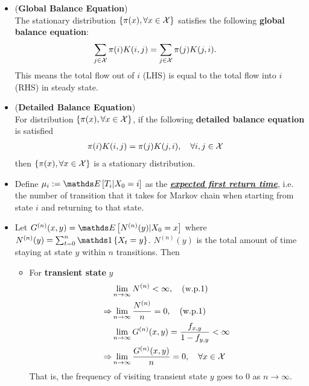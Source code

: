 \documentclass[11pt]{article}
\begin{document}
\begin{itemize}
\item \begin{proposition} (\textbf{Global Balance Equation})\\
The stationary distribution $\left\{\pi(x), \forall x\in {\mathcal X}\right\}$ satisfies the following \textbf{global balance equation}:
\begin{align}
\sum_{j \in {\mathcal X}}\pi(i)K(i, j) &=  \sum_{j \in {\mathcal X}}\pi(j)K(j, i).  \label{eqn: mc_global_balance_eqn}
\end{align} This means the total flow out of $i$ (LHS) is equal to the total flow into $i$ (RHS) in steady state.
\end{proposition}

\item \begin{proposition} (\textbf{Detailed Balance Equation})\\
For distribution $\left\{\pi(x), \forall x\in {\mathcal X}\right\}$, if the following \textbf{detailed balance equation} is satisfied
\begin{align}
\pi(i)K(i, j) &=  \pi(j)K(j, i),\quad \forall i, j\in {\mathcal X}  \label{eqn: mc_detailed_balance_eqn}
\end{align} then $\left\{\pi(x), \forall x\in {\mathcal X}\right\}$ is a stationary distribution.
\end{proposition}

\item \begin{definition}
Define $\mu_{i} := \E{}{T_{i} | X_{0} = i}$ as the \underline{\emph{\textbf{expected first return time}}}, i.e. the number of transition that it takes for Markov chain  when starting from state $i$ and returning to that state.
\end{definition}


\item Let $G^{(n)}(x, y) = \E{}{N^{(n)}(y) | X_{0} = x}$ where $N^{(n)}(y) = \sum_{t=0}^{n}\ind{X_{t} = y}$. $N^{(n)}(y)$ is the total amount of time staying at state $y$ within $n$ transitions. Then
\begin{itemize}
\item \begin{theorem}
For \textbf{transient state} $y$
\begin{align*}
&\lim_{n\rightarrow \infty}N^{(n)} < \infty, \quad (\text{w.p.1})\\
 \Rightarrow &\lim_{n\rightarrow \infty}\frac{N^{(n)}}{n} = 0, \quad (\text{w.p.1})\\
&\lim_{n\rightarrow \infty}G^{(n)}(x, y) = \frac{f_{x,y}}{1 - f_{y,y}} < \infty\\
\Rightarrow &\lim_{n\rightarrow \infty}\frac{G^{(n)}(x, y)}{n} = 0, \quad \forall x\in {\mathcal X}
\end{align*} That is, the frequency of visiting transient state $y$ goes to $0$ as $n\rightarrow \infty$. 
\end{theorem}


\end{itemize}
\end{itemize}
\end{document}
